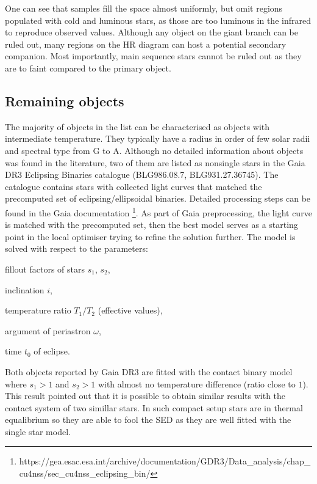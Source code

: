 \documentclass{pracalicmgr}
\newenvironment{itemize*}%
  {\vspace{-\topsep}
    \begin{itemize}%
    \setlength{\itemsep}{0pt}%
    \setlength{\parskip}{0pt}}%
  {\end{itemize}
  \vspace{-\topsep}}
\begin{document}
One can see that samples fill the space almost uniformly, but omit regions populated with cold and luminous stars, as those are too luminous in the infrared to reproduce observed values.
Although any object on the giant branch can be ruled out, many regions on the HR diagram can host a potential secondary companion. 
Most importantly, main sequence stars cannot be ruled out as they are to faint compared to the primary object.
\newpage
\subsection{Remaining objects}
The majority of objects in the list can be characterised as objects with intermediate temperature. They typically have a radius in order of
few solar radii and spectral type from G to A.
Although no detailed information about objects was found in the literature, two of them
are listed as nonsingle stars in the Gaia DR3 Eclipsing Binaries catalogue (BLG986.08.7, BLG931.27.36745).
The catalogue contains stars with collected light curves that matched the precomputed set of eclipsing/ellipsoidal binaries. 
Detailed processing steps can be found in the Gaia documentation \footnote[1]{https://gea.esac.esa.int/archive/documentation/GDR3/Data\_analysis/chap\_cu4nss/sec\_cu4nss\_eclipsing\_bin/}.
As part of Gaia preprocessing, the light curve is matched with the precomputed set, then the best model serves as a starting point in the local optimiser trying to refine the solution further.
The model is solved with respect to the parameters:
\begin{itemize*}
    \item fillout factors of stars $s_1$, $s_2$,
    \item inclination $i$,
    \item temperature ratio $T_1/T_2$ (effective values),
    \item argument of periastron $\omega$,
    \item time $t_0$ of eclipse.
\end{itemize*}
Both objects reported by Gaia DR3 are fitted with the contact binary model where $s_1>1$ and $s_2>1$ with almost no
temperature difference (ratio close to $1$). This result pointed out that it is possible to obtain similar results
with the contact system of two simillar stars. In such compact setup stars are in thermal equalibrium so they are able to fool the SED as
they are well fitted with the single star model. 
\end{document}
